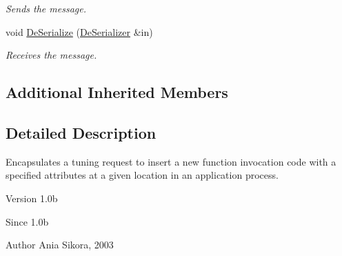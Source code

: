 \begin{DoxyCompactItemize}
\begin{DoxyCompactList}\small\item\em Sends the message. \end{DoxyCompactList}\item 
\hypertarget{class_common_1_1_insert_function_call_request_a84571a179ad526574049a45066226171}{void \hyperlink{class_common_1_1_insert_function_call_request_a84571a179ad526574049a45066226171}{De\-Serialize} (\hyperlink{class_common_1_1_de_serializer}{De\-Serializer} \&in)}\label{class_common_1_1_insert_function_call_request_a84571a179ad526574049a45066226171}

\begin{DoxyCompactList}\small\item\em Receives the message. \end{DoxyCompactList}\end{DoxyCompactItemize}
\subsection*{Additional Inherited Members}


\subsection{Detailed Description}
Encapsulates a tuning request to insert a new function invocation code with a specified attributes at a given location in an application process. 

\begin{DoxyVersion}{Version}
1.\-0b 
\end{DoxyVersion}
\begin{DoxySince}{Since}
1.\-0b 
\end{DoxySince}
\begin{DoxyAuthor}{Author}
Ania Sikora, 2003 
\end{DoxyAuthor}


